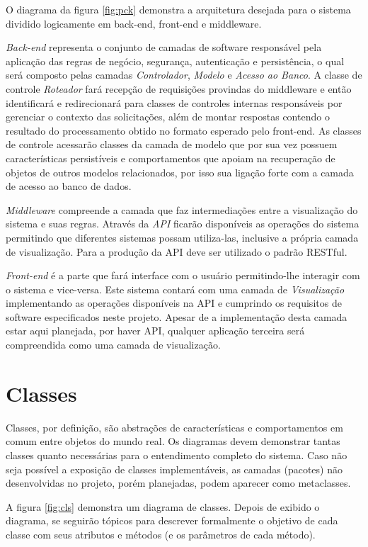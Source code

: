 \documentclass[12pt,openright,a4paper,brazil]{abntex2}
\begin{document}
O diagrama da figura \ref{fig:pck} demonstra a arquitetura desejada para o sistema dividido logicamente em back-end, front-end e middleware. 

\emph{Back-end} representa o conjunto de camadas de software responsável pela aplicação das regras de negócio, segurança, autenticação e persistência, o qual será composto pelas camadas \emph{Controlador}, \emph{Modelo} e \emph{Acesso ao Banco}. A classe de controle \emph{Roteador} fará recepção de requisições provindas do middleware e então identificará e redirecionará para classes de controles internas responsáveis por gerenciar o contexto das solicitações, além de montar respostas contendo o resultado do processamento obtido no formato esperado pelo front-end. As classes de controle acessarão classes da camada de modelo que por sua vez possuem características persistíveis e comportamentos que apoiam na recuperação de objetos de outros modelos relacionados, por isso sua ligação forte com a camada de acesso ao banco de dados. 

\emph{Middleware} compreende a camada que faz intermediações entre a visualização do sistema e suas regras. Através da \emph{API} ficarão disponíveis as operações do sistema permitindo que diferentes sistemas possam utiliza-las, inclusive a própria camada de visualização. Para a produção da API deve ser utilizado o padrão RESTful.

\emph{Front-end} é a parte que fará interface com o usuário permitindo-lhe interagir com o sistema e vice-versa. Este sistema contará com uma camada de \emph{Visualização} implementando as operações disponíveis na API e cumprindo os requisitos de software especificados neste projeto. Apesar de a implementação desta camada estar aqui planejada, por haver API, qualquer aplicação terceira será compreendida como uma camada de visualização.

\section{Classes}

Classes, por definição, são abstrações de características e comportamentos em comum entre objetos do mundo real. Os diagramas devem demonstrar tantas classes quanto necessárias para o entendimento completo do sistema. Caso não seja possível a exposição de classes implementáveis, as camadas (pacotes) não desenvolvidas no projeto, porém planejadas, podem aparecer como metaclasses.

A figura \ref{fig:cls} demonstra um diagrama de classes. Depois de exibido o diagrama, se seguirão tópicos para descrever formalmente o objetivo de cada classe com seus atributos e métodos (e os parâmetros de cada método).
\end{document}
